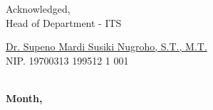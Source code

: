 
\begin{center}
  Acknowledged, \\
  Head of \engdepartment{} Department \engfacultyshort{} - ITS \\

  \vspace{15ex}

  \underline{Dr. Supeno Mardi Susiki Nugroho, S.T., M.T.} \\
  NIP. 19700313 199512 1 001
\end{center}

\begin{center}
  \textbf{\MakeUppercase{\place{}}\\Month, \the\year{}}
\end{center}
\endgroup
